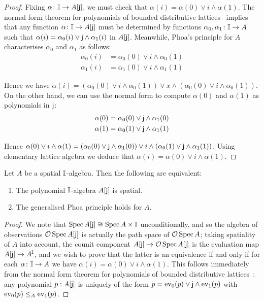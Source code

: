 \begin{proof}
  Fixing $\alpha\colon \mathbb{I}\to A[\mathsf{j}]$, we must check that $\alpha(i) = \alpha(0) \vee i \wedge \alpha(1)$. 
  The normal form theorem for polynomials of bounded distributive lattices~\citep[Ch.\ 1, Thm.\ 10.11]{lausch2000algebra} implies that any function $\alpha\colon \mathbb{I}\to A[\mathsf{j}]$ must be determined by functions $\alpha_0,\alpha_1\colon \mathbb{I}\to A$ such that $\alpha(i) = \alpha_0(i)\vee \mathsf{j} \wedge \alpha_1(i)$ in $A[\mathsf{j}]$. Meanwhile, Phoa's principle for $A$ characterises $\alpha_0$ and $\alpha_1$ as follows:
  \begin{align*}
    \alpha_0(i) &= \alpha_0(0) \vee i \wedge \alpha_0(1)
    \\ 
    \alpha_1(i) &= \alpha_1(0) \vee i \wedge \alpha_1(1)
  \end{align*}

  Hence we have $\alpha(i) = (\alpha_0(0) \vee i \wedge \alpha_0(1))\lor x \wedge (\alpha_0(0) \vee i \wedge \alpha_0(1))$. On the other hand, we can use the normal form to compute $\alpha(0)$ and $\alpha(1)$ as polynomials in $\mathsf{j}$: 
  \begin{align*}
    \alpha(0) &= \alpha_0(0) \vee \mathsf{j}\wedge \alpha_1(0)\\
    \alpha(1) &= \alpha_0(1) \vee \mathsf{j}\wedge \alpha_1(1)
  \end{align*}

  Hence $\alpha(0)\lor i \wedge \alpha(1) = (\alpha_0(0) \vee \mathsf{j}\wedge \alpha_1(0))\vee i \wedge (\alpha_0(1) \vee \mathsf{j}\wedge \alpha_1(1))$. Using elementary lattice algebra we deduce that $\alpha(i) = \alpha(0) \vee i \wedge \alpha(1)$.
\end{proof}

\begin{theorem}\label{obs:sqcp-phoa-gen}
  Let $A$ be a spatial $\mathbb{I}$-algebra. Then the following are equivalent:
  \begin{enumerate}
    \item The polynomial $\mathbb{I}$-algebra $A[\mathsf{j}]$ is spatial.
    \item The generalised Phoa principle holds for $A$.
  \end{enumerate}
\end{theorem}

\begin{proof}
  We note that $\operatorname{Spec}{A[\mathsf{j}]} \cong \operatorname{Spec}{A}\times \mathbb{I}$ unconditionally, and so the algebra of observations $\mathcal{O}\operatorname{Spec}{A[\mathsf{j}]}$ is actually the path space of $\mathcal{O}\operatorname{Spec}{A}$; taking spatiality of $A$ into account, the counit component $A[\mathsf{j}]\to \mathcal{O}\operatorname{Spec} A[\mathsf{j}]$ is the evaluation map $A[\mathsf{j}] \to A^{\mathbb{I}}$, and we wish to prove that the latter is an equivalence if and only if for each $\alpha\colon \mathbb{I}\to A$ we have $\alpha(i)=\alpha(0)\vee i\wedge\alpha(1)$. 
  This follows immediately from the normal form theorem for polynomials of bounded distributive lattices~\citep[Ch.\ 1, Thm.\ 10.11]{lausch2000algebra}: any polynomial $p:A[\mathsf{j}]$ is uniquely of the form $p = \mathrm{ev}_0(p) \vee \mathsf{j} \wedge \mathrm{ev}_1(p)$ with $\mathrm{ev}_0(p)\le_A \mathrm{ev}_1(p)$.
\end{proof}


